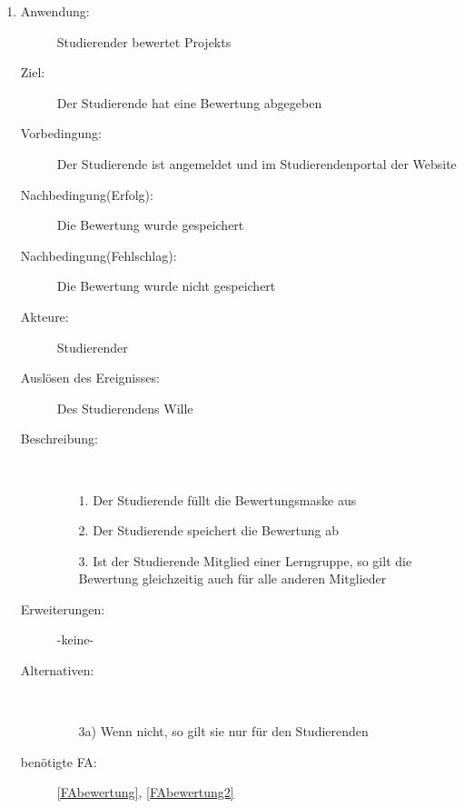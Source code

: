 \documentclass[parskip=full]{scrartcl}
\newcommand{\swtLabel}[1]{\textbf{/#1\arabic*0/}}
\begin{document}
\begin{enumerate}[label=\swtLabel{S}]
%   
  
  \item \label{UCstudBewertung}
  \begin{description}
  \item[Anwendung:] Studierender bewertet \glspl{Projekt}
  \item[Ziel:] Der Studierende hat eine Bewertung abgegeben
  	\item[Vorbedingung:] Der Studierende ist angemeldet und im Studierendenportal der
  	Website
  	\item[Nachbedingung(Erfolg):] Die Bewertung wurde gespeichert
  	\item[Nachbedingung(Fehlschlag):] Die Bewertung wurde nicht gespeichert
  	\item[Akteure:] Studierender
  	\item[Auslösen des Ereignisses:] Des Studierendens Wille
  	\item[Beschreibung:]~
  	 \begin{enumerate}
  	   \item[1.] Der Studierende füllt die Bewertungsmaske aus %
  	   \item[2.] Der Studierende speichert die Bewertung ab
  	   \item[3.] Ist der Studierende Mitglied einer \gls{Lerngruppe}, so gilt die
  	   Bewertung gleichzeitig auch für alle anderen Mitglieder
  	 \end{enumerate}
  	\item[Erweiterungen:] -keine-
  	\item[Alternativen:] ~
  	\begin{enumerate}
  	  \item[3a)] Wenn nicht, so gilt sie nur für den Studierenden
  	 \end{enumerate}
  	\item[benötigte FA:] \ref{FAbewertung}, \ref{FAbewertung2}
  \end{description}
   

\end{enumerate}
\end{document}

